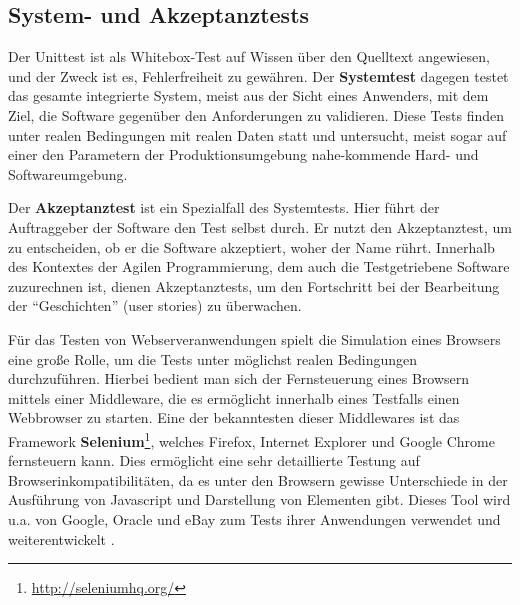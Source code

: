 \subsection{System- und Akzeptanztests}

Der Unittest ist als Whitebox-Test auf Wissen über den Quelltext angewiesen, und der Zweck ist es, Fehlerfreiheit zu gewähren. Der \textbf{Systemtest} dagegen testet das gesamte integrierte System, meist aus der Sicht eines Anwenders, mit dem Ziel, die Software gegenüber den Anforderungen zu validieren. Diese Tests finden unter realen Bedingungen mit realen Daten statt und untersucht, meist sogar auf einer den Parametern der Produktionsumgebung nahe-kommende Hard- und Softwareumgebung.

Der \textbf{Akzeptanztest} ist ein Spezialfall des Systemtests. Hier führt der Auftraggeber der Software den Test selbst durch. Er nutzt den Akzeptanztest, um zu entscheiden, ob er die Software akzeptiert, woher der Name rührt.
Innerhalb des Kontextes der Agilen Programmierung, dem auch die Testgetriebene Software zuzurechnen ist, dienen Akzeptanztests, um den Fortschritt bei der Bearbeitung der "`Geschichten"' (user stories) zu überwachen.

Für das Testen von Webserveranwendungen spielt die Simulation eines Browsers eine große Rolle, um die Tests unter möglichst realen Bedingungen durchzuführen. Hierbei bedient man sich der Fernsteuerung eines Browsern mittels einer Middleware, die es ermöglicht innerhalb eines Testfalls einen Webbrowser zu starten. Eine der bekanntesten dieser Middlewares ist das Framework \textbf{Selenium}\footnote{\url{http://seleniumhq.org/}}, welches Firefox, Internet Explorer und Google Chrome fernsteuern kann. Dies ermöglicht eine sehr detaillierte Testung auf Browserinkompatibilitäten, da es unter den Browsern gewisse Unterschiede in der Ausführung von Javascript und Darstellung von Elementen gibt. Dieses Tool wird u.a. von Google, Oracle und eBay zum Tests ihrer Anwendungen verwendet und weiterentwickelt \citep{selenium_hq_selenium_2010}.
